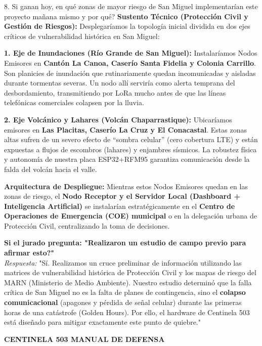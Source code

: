 \documentclass[10pt,letterpaper]{article}
\begin{document}
\begin{killerbox}{8. Si ganan hoy, \textquestiondown en qué zonas de mayor riesgo de San Miguel implementarían este proyecto mañana mismo y por qué?}
\small\justifying
\textbf{Sustento Técnico (Protección Civil y Gestión de Riesgos):} Desplegaríamos la topología inicial dividida en dos ejes críticos de vulnerabilidad histórica en San Miguel:

\textbf{1. Eje de Inundaciones (Río Grande de San Miguel):} Instalaríamos Nodos Emisores en \textbf{Cantón La Canoa, Caserío Santa Fidelia y Colonia Carrillo}. Son planicies de inundación que rutinariamente quedan incomunicadas y aisladas durante tormentas severas. Un nodo allí serviría como alerta temprana del desbordamiento, transmitiendo por LoRa mucho antes de que las líneas telefónicas comerciales colapsen por la lluvia.

\textbf{2. Eje Volcánico y Lahares (Volcán Chaparrastique):} Ubicaríamos emisores en \textbf{Las Placitas, Caserío La Cruz y El Conacastal}. Estas zonas altas sufren de un severo efecto de ``sombra celular'' (cero cobertura LTE) y están expuestas a flujos de escombros (lahares) y enjambres sísmicos. La robustez física y autonomía de nuestra placa ESP32+RFM95 garantiza comunicación desde la falda del volcán hacia el valle.

\textbf{Arquitectura de Despliegue:} Mientras estos Nodos Emisores quedan en las zonas de riesgo, el \textbf{Nodo Receptor y el Servidor Local (Dashboard + Inteligencia Artificial)} se instalarían estratégicamente en el \textbf{Centro de Operaciones de Emergencia (COE) municipal} o en la delegación urbana de Protección Civil, centralizando la toma de decisiones.

\vspace{1mm}
\textbf{Si el jurado pregunta: "\textquestiondown Realizaron un estudio de campo previo para afirmar esto?"} \\
\textit{Respuesta:} "Sí. Realizamos un cruce preliminar de información utilizando las matrices de vulnerabilidad histórica de Protección Civil y los mapas de riesgo del MARN (Ministerio de Medio Ambiente). Nuestro estudio determinó que la falla crítica de San Miguel no es la falta de planes de contingencia, sino el \textbf{colapso comunicacional} (apagones y pérdida de señal celular) durante las primeras horas de una catástrofe (Golden Hours). Por ello, el hardware de Centinela 503 está diseñado para mitigar exactamente este punto de quiebre."
\end{killerbox}

\vfill
\noindent
{\footnotesize\color{cyan}\bfseries CENTINELA 503 \hfill MANUAL DE DEFENSA}
\end{document}
